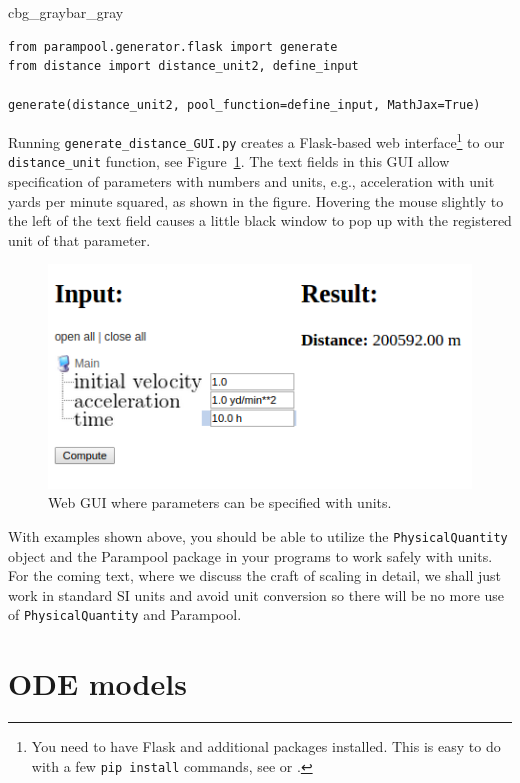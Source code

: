 \documentclass[graybox,envcountchap,sectrefs,final]{svmonodo}
\newenvironment{_pro_tight}[2]{
   \def\FrameCommand{\color{#2}\vrule width 1mm\normalcolor\colorbox{#1}}
   \FrameRule0.6pt\MakeFramed {\advance\hsize-2mm\FrameRestore}\vskip3mm}
   {\vskip0mm\endMakeFramed}
\newenvironment{pro}[2]{
\bgroup\rmfamily
\fboxsep=0mm\relax
\begin{_pro_tight}{#1}{#2}
\list{}{\parsep=-2mm\parskip=0mm\topsep=0pt\leftmargin=2mm
\rightmargin=2\leftmargin\leftmargin=4pt\relax}
\item\relax}
{\endlist\end{_pro_tight}\egroup}
\begin{document}
\begin{pro}{cbg_gray}{bar_gray}\begin{Verbatim}[numbers=none,fontsize=\fontsize{9pt}{9pt},baselinestretch=0.95,xleftmargin=2mm]
from parampool.generator.flask import generate
from distance import distance_unit2, define_input

generate(distance_unit2, pool_function=define_input, MathJax=True)
\end{Verbatim}
\end{pro}
\noindent
Running \Verb!generate_distance_GUI.py! creates a Flask-based web
interface\footnote{You need to have Flask and additional packages installed. This is easy to do with a few \texttt{pip install} commands, see \cite{parampool} or \cite{web4sciapps}.}
to our \Verb!distance_unit! function, see Figure~\ref{scale:dimunit:fig:GUI}.
The text fields in this GUI allow specification of parameters with
numbers and units, e.g., acceleration with unit yards per minute squared,
as shown in the figure. Hovering the mouse slightly to the left of
the text field causes a little black window to pop up with the registered unit
of that parameter.





\begin{figure}[!ht]  %
  \centerline{\includegraphics[width=0.5\linewidth]{fig-scaling/distance_GUI.png}}
  \caption{
  Web GUI where parameters can be specified with units. \label{scale:dimunit:fig:GUI}
  }
\end{figure}


With examples shown above, you should be able to utilize the
\texttt{PhysicalQuantity} object and the Parampool package in your programs
to work safely with units. For the coming text, where we discuss the
craft of scaling in detail, we shall just work in standard SI units
and avoid unit conversion so there will be no more use of
\texttt{PhysicalQuantity} and Parampool.


\chapter{ODE models}
\end{document}
